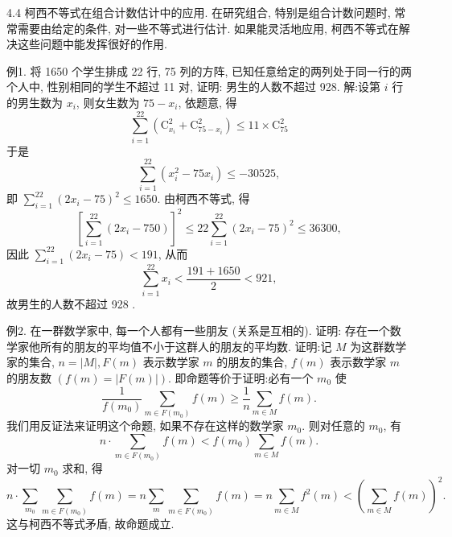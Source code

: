
4.4 柯西不等式在组合计数估计中的应用.
在研究组合, 特别是组合计数问题时, 常常需要由给定的条件, 对一些不等式进行估计.
如果能灵活地应用, 柯西不等式在解决这些问题中能发挥很好的作用.



例1. 将 1650 个学生排成 22 行, 75 列的方阵, 已知任意给定的两列处于同一行的两个人中, 性别相同的学生不超过 11 对, 证明: 男生的人数不超过 928.
解:设第 $i$ 行的男生数为 $x_i$, 则女生数为 $75-x_i$, 依题意, 得
$$
\sum_{i=1}^{22}\left(\mathrm{C}_{x_i}^2+\mathrm{C}_{75-x_i}^2\right) \leqslant 11 \times \mathrm{C}_{75}^2
$$
于是
$$
\sum_{i=1}^{22}\left(x_i^2-75 x_i\right) \leqslant-30525,
$$
即 $\sum_{i=1}^{22}\left(2 x_i-75\right)^2 \leqslant 1650$. 由柯西不等式, 得
$$
\left[\sum_{i=1}^{22}\left(2 x_i-750\right)\right]^2 \leqslant 22 \sum_{i=1}^{22}\left(2 x_i-75\right)^2 \leqslant 36300,
$$
因此 $\sum_{i=1}^{22}\left(2 x_i-75\right)<191$, 从而
$$
\sum_{i=1}^{22} x_i<\frac{191+1650}{2}<921,
$$
故男生的人数不超过 928 .



例2. 在一群数学家中, 每一个人都有一些朋友 (关系是互相的). 证明: 存在一个数学家他所有的朋友的平均值不小于这群人的朋友的平均数.
证明:记 $M$ 为这群数学家的集合, $n=|M|, F(m)$ 表示数学家 $m$ 的朋友的集合, $f(m)$ 表示数学家 $m$ 的朋友数 $(f(m)=|F(m)|)$. 即命题等价于证明:必有一个 $m_0$ 使
$$
\frac{1}{f\left(m_0\right)} \sum_{m \in F\left(m_0\right)} f(m) \geqslant \frac{1}{n} \sum_{m \in M} f(m) .
$$
我们用反证法来证明这个命题, 如果不存在这样的数学家 $m_0$. 则对任意的 $m_0$, 有
$$
n \cdot \sum_{m \in F\left(m_0\right)} f(m)<f\left(m_0\right) \sum_{m \in M} f(m) .
$$
对一切 $m_0$ 求和, 得
$$
n \cdot \sum_{m_0} \sum_{m \in F\left(m_0\right)} f(m)=n \sum_m \sum_{m \in F\left(m_0\right)} f(m)=n \sum_{m \in M} f^2(m)<\left(\sum_{m \in M} f(m)\right)^2 .
$$
这与柯西不等式矛盾, 故命题成立.



